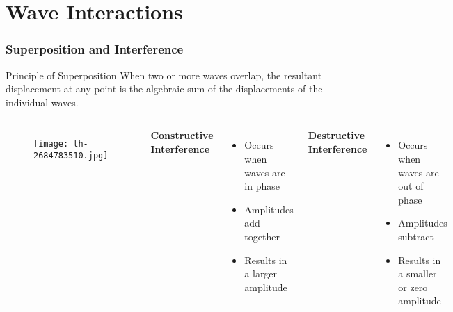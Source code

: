 \documentclass{beamer}
\begin{document}
\section{Wave Interactions}

\begin{frame}
\frametitle{Superposition and Interference}
\begin{block}{Principle of Superposition}
When two or more waves overlap, the resultant displacement at any point is the algebraic sum of the displacements of the individual waves.
\end{block}

\begin{columns}

\begin{figure}
    \centering
    \texttt{[image: th-2684783510.jpg]}
\end{figure}

\textbf{Constructive Interference}
\begin{itemize}
\item Occurs when waves are in phase
\item Amplitudes add together
\item Results in a larger amplitude
\end{itemize}
\textbf{Destructive Interference}
\begin{itemize}
\item Occurs when waves are out of phase
\item Amplitudes subtract
\item Results in a smaller or zero amplitude
\end{itemize}
\end{columns}
\end{frame}
\end{document}
